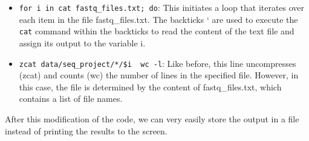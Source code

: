 \documentclass[
  letterpaper,
  DIV=11,
  numbers=noendperiod]{scrreprt}
\newenvironment{Shaded}{}{}
\newcommand{\AttributeTok}[1]{\textcolor[rgb]{0.84,0.23,0.29}{#1}}
\newcommand{\CommentTok}[1]{\textcolor[rgb]{0.42,0.45,0.49}{#1}}
\newcommand{\ControlFlowTok}[1]{\textcolor[rgb]{0.84,0.23,0.29}{#1}}
\newcommand{\FunctionTok}[1]{\textcolor[rgb]{0.44,0.26,0.76}{#1}}
\newcommand{\KeywordTok}[1]{\textcolor[rgb]{0.84,0.23,0.29}{#1}}
\newcommand{\NormalTok}[1]{\textcolor[rgb]{0.14,0.16,0.18}{#1}}
\newcommand{\OperatorTok}[1]{\textcolor[rgb]{0.14,0.16,0.18}{#1}}
\newcommand{\PreprocessorTok}[1]{\textcolor[rgb]{0.84,0.23,0.29}{#1}}
\newcommand{\VariableTok}[1]{\textcolor[rgb]{0.89,0.38,0.04}{#1}}
\providecommand{\tightlist}{%
  \setlength{\itemsep}{0pt}\setlength{\parskip}{0pt}}\usepackage{longtable,booktabs,array}
\begin{document}
\begin{itemize}
\tightlist
\item
  \texttt{for\ i\ in\ \textasciigrave{}cat\ fastq\_files.txt\textasciigrave{};\ do}:
  This initiates a loop that iterates over each item in the file
  fastq\_files.txt. The backticks ` are used to execute the \texttt{cat}
  command within the backticks to read the content of the text file and
  assign its output to the variable i.
\item
  \texttt{zcat\ data/seq\_project/*/\$i\ \textbar{}\ wc\ -l}: Like
  before, this line uncompresses (zcat) and counts (wc) the number of
  lines in the specified file. However, in this case, the file is
  determined by the content of fastq\_files.txt, which contains a list
  of file names.
\end{itemize}

After this modification of the code, we can very easily store the output
in a file instead of printing the results to the screen.

\begin{Shaded}
\end{Shaded}
\end{document}
